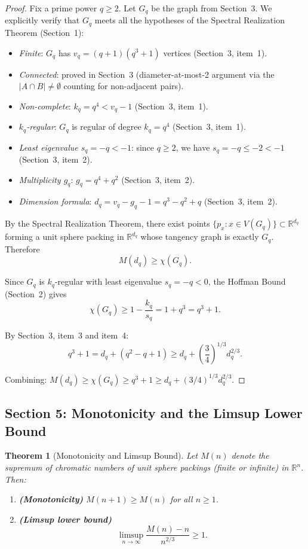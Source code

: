 \documentclass{article}
\newtheorem{theorem}{Theorem}[section]
\theoremstyle{definition}
\begin{document}
\begin{proof}
Fix a prime power $q\ge 2$. Let $G_q$ be the graph from Section~3. We explicitly verify that $G_q$ meets all the hypotheses of the Spectral Realization Theorem (Section~1):
\begin{itemize}
  \item \emph{Finite}: $G_q$ has $v_q=(q+1)(q^3+1)$ vertices (Section~3, item~1).
  \item \emph{Connected}: proved in Section~3 (diameter-at-most-2 argument via the $|A\cap B|\ne\emptyset$ counting for non-adjacent pairs).
  \item \emph{Non-complete}: $k_q=q^4<v_q-1$ (Section~3, item~1).
  \item \emph{$k_q$-regular}: $G_q$ is regular of degree $k_q=q^4$ (Section~3, item~1).
  \item \emph{Least eigenvalue $s_q=-q<-1$}: since $q\ge 2$, we have $s_q=-q\le -2<-1$ (Section~3, item~2).
  \item \emph{Multiplicity $g_q$}: $g_q=q^4+q^2$ (Section~3, item~2).
  \item \emph{Dimension formula}: $d_q=v_q-g_q-1=q^3-q^2+q$ (Section~3, item~2).
\end{itemize}
By the Spectral Realization Theorem, there exist points $\{p_x:x\in V(G_q)\}\subset\mathbb{R}^{d_q}$ forming a unit sphere packing in $\mathbb{R}^{d_q}$ whose tangency graph is exactly $G_q$. Therefore
\[
M(d_q)\ge\chi(G_q).
\]

Since $G_q$ is $k_q$-regular with least eigenvalue $s_q=-q<0$, the Hoffman Bound (Section~2) gives
\[
\chi(G_q)\ge 1-\frac{k_q}{s_q}=1+q^3=q^3+1.
\]

By Section~3, item~3 and item~4:
\[
q^3+1=d_q+(q^2-q+1)\ge d_q+\left(\frac{3}{4}\right)^{1/3}d_q^{2/3}.
\]

Combining: $M(d_q)\ge\chi(G_q)\ge q^3+1\ge d_q+(3/4)^{1/3}d_q^{2/3}$.
\end{proof}

\subsection*{Section 5: Monotonicity and the Limsup Lower Bound}

\begin{theorem}[Monotonicity and Limsup Bound]
\label{thm:limsup}
Let $M(n)$ denote the supremum of chromatic numbers of unit sphere packings (finite or infinite) in $\mathbb{R}^n$. Then:
\begin{enumerate}
  \item \textbf{(Monotonicity)} $M(n+1)\ge M(n)$ for all $n\ge 1$.
  \item \textbf{(Limsup lower bound)}
    \[
      \limsup_{n\to\infty}\frac{M(n)-n}{n^{2/3}}\ge 1.
    \]
\end{enumerate}
\end{theorem}
\end{document}

